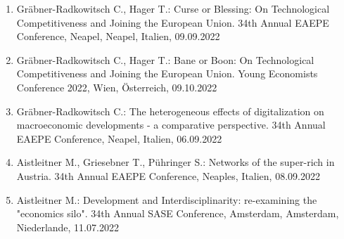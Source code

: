 \begin{enumerate}
	\item Gräbner-Radkowitsch C., Hager T.: Curse or Blessing: On Technological Competitiveness and Joining the European Union. 34th Annual EAEPE Conference, Neapel, Neapel, Italien, 09.09.2022
	\item Gräbner-Radkowitsch C., Hager T.: Bane or Boon: On Technological Competitiveness and Joining the European Union. Young Economists Conference 2022, Wien, Österreich, 09.10.2022
	\item Gräbner-Radkowitsch C.: The heterogeneous effects of digitalization on macroeconomic developments - a comparative perspective. 34th Annual EAEPE Conference, Neapel, Italien, 06.09.2022
	\item Aistleitner M., Griesebner T., Pühringer S.: Networks of the super-rich in Austria. 34th Annual EAEPE Conference, Neaples, Italien, 08.09.2022
	\item Aistleitner M.: Development and Interdisciplinarity: re-examining the "economics silo". 34th Annual SASE Conference, Amsterdam, Amsterdam, Niederlande, 11.07.2022
\end{enumerate}
